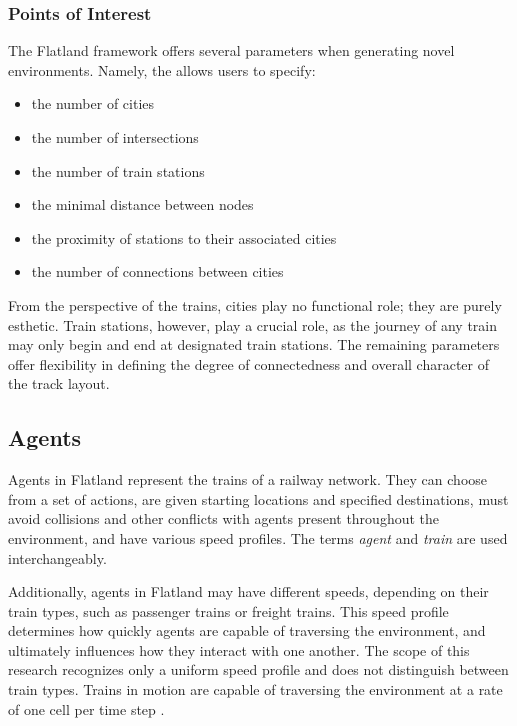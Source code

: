 \documentclass[11pt]{article}
\begin{document}
\subsubsection{Points of Interest}
The Flatland framework offers several parameters when generating novel environments.  Namely, the  allows users to specify:
\begin{itemize}
	\item the number of cities
	\item the number of intersections
	\item the number of train stations
	\item the minimal distance between nodes
	\item the proximity of stations to their associated cities
	\item the number of connections between cities
\end {itemize}

\noindent From the perspective of the trains, cities play no functional role; they are purely esthetic. Train stations, however, play a crucial role, as the journey of any train may only begin and end at designated train stations.  The remaining parameters offer flexibility in defining the degree of connectedness and overall character of the track layout. \medskip


\subsection{Agents}
\label{sec:Agents}
Agents in Flatland represent the trains of a railway network.  They can choose from a set of actions, are given starting locations and specified destinations, must avoid collisions and other conflicts with agents present throughout the environment, and have various speed profiles.  The terms \textit{agent} and \textit{train} are used interchangeably.

Additionally, agents in Flatland may have different speeds, depending on their train types, such as passenger trains or freight trains.  This speed profile determines how quickly agents are capable of traversing the environment, and ultimately influences how they interact with one another.  The scope of this research recognizes only a uniform speed profile and does not distinguish between train types.  Trains in motion are capable of traversing the environment at a rate of one cell per time step \citep{baeiegljmomonyspwaaggo21a}.
\end{document}
